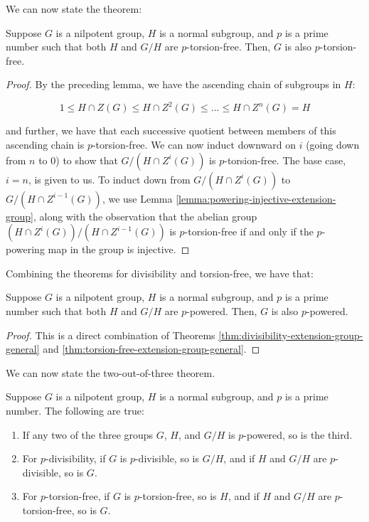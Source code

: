 We can now state the theorem:

\begin{theorem}\label{thm:torsion-free-extension-group-general}
  Suppose $G$ is a nilpotent group, $H$ is a normal subgroup, and $p$
  is a prime number such that both $H$ and $G/H$ are
  $p$-torsion-free. Then, $G$ is also $p$-torsion-free.
\end{theorem}

\begin{proof}
  By the preceding lemma, we have the ascending chain of subgroups in
  $H$:

  $$1 \le H \cap Z(G) \le H \cap Z^2(G) \le \dots \le H \cap Z^n(G) = H$$

  and further, we have that each successive quotient between members
  of this ascending chain is $p$-torsion-free. We can now induct
  downward on $i$ (going down from $n$ to $0$) to show that $G/(H \cap
  Z^i(G))$ is $p$-torsion-free. The base case, $i = n$, is given to
  us. To induct down from $G/(H \cap Z^i(G))$ to $G/(H \cap
  Z^{i-1}(G))$, we use Lemma \ref{lemma:powering-injective-extension-group},
  along with the observation that the abelian group $(H \cap
  Z^i(G))/(H \cap Z^{i-1}(G))$ is $p$-torsion-free if and only if the
  $p$-powering map in the group is injective.
\end{proof}

Combining the theorems for divisibility and torsion-free, we have that:

\begin{theorem}\label{thm:powering-extension-group-general}
  Suppose $G$ is a nilpotent group, $H$ is a normal subgroup, and $p$
  is a prime number such that both $H$ and $G/H$ are
  $p$-powered. Then, $G$ is also $p$-powered.
\end{theorem}

\begin{proof}
  This is a direct combination of Theorems
  \ref{thm:divisibility-extension-group-general} and
  \ref{thm:torsion-free-extension-group-general}.
\end{proof}

We can now state the two-out-of-three theorem.

\begin{theorem}\label{thm:two-out-of-three}
  Suppose $G$ is a nilpotent group, $H$ is a normal subgroup, and $p$
  is a prime number. The following are true:

  \begin{enumerate}
  \item If any two of the three groups $G$, $H$, and $G/H$ is
    $p$-powered, so is the third.
  \item For $p$-divisibility, if $G$ is $p$-divisible, so is $G/H$,
    and if $H$ and $G/H$ are $p$-divisible, so is $G$.
  \item For $p$-torsion-free, if $G$ is $p$-torsion-free, so is $H$,
    and if $H$ and $G/H$ are $p$-torsion-free, so is $G$.
  \end{enumerate}
\end{theorem}

